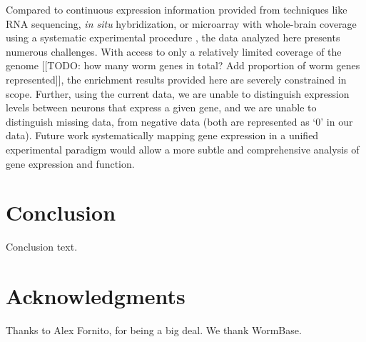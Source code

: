 \documentclass[10pt,letterpaper]{article}
\begin{document}
Compared to continuous expression information provided from techniques like RNA sequencing, \emph{in situ} hybridization, or microarray with whole-brain coverage using a systematic experimental procedure \cite{Lein:2007jn, Shen:2012ua, Tasic:2016jp}, the data analyzed here presents numerous challenges.
With access to only a relatively limited coverage of the genome [[TODO: how many worm genes in total? Add proportion of worm genes represented]], the enrichment results provided here are severely constrained in scope.
Further, using the current data, we are unable to distinguish expression levels between neurons that express a given gene, and we are unable to distinguish missing data, from negative data (both are represented as `0' in our data).
Future work systematically mapping gene expression in a unified experimental paradigm would allow a more subtle and comprehensive analysis of gene expression and function.


\section*{Conclusion}

Conclusion text.

\section*{Acknowledgments}
Thanks to Alex Fornito, for being a big deal.
We thank WormBase.

\nolinenumbers

%
%
%



\end{document}
